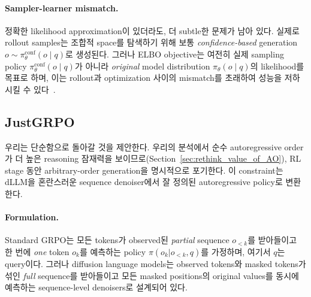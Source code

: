 \paragraph{Sampler-learner mismatch.}
정확한 likelihood approximation이 있더라도, 더 subtle한 문제가 남아 있다.
실제로 rollout samples는 조합적 space를 탐색하기 위해 보통 \emph{confidence-based} generation $o \sim \pi_{\theta}^{\text{conf}}(o \mid q)$로 생성된다.
그러나 ELBO objective는 여전히 실제 sampling policy $\pi_{\theta}^{\text{conf}}(o \mid q)$가 아니라 \emph{original} model distribution $\pi_\theta(o \mid q)$의 likelihood를 목표로 하며, 이는 rollout과 optimization 사이의 mismatch를 초래하여 성능을 저하시킬 수 있다~\cite{schulman2015trust}.


\subsection{JustGRPO}
\label{sec:justgrpo_detail}
우리는 단순함으로 돌아갈 것을 제안한다. 우리의 분석에서 순수 autoregressive order가 더 높은 reasoning 잠재력을 보이므로(Section~\ref{sec:rethink_value_of_AO}), RL stage 동안 arbitrary-order generation을 명시적으로 포기한다. 이 constraint는 dLLM을 혼란스러운 sequence denoiser에서 잘 정의된 autoregressive policy로 변환한다.

\paragraph{Formulation.}
Standard GRPO는 모든 tokens가 observed된 \emph{partial} sequence $o_{<k}$를 받아들이고 한 번에 \emph{one} token $o_k$를 예측하는 policy $\pi(o_k | o_{<k}, q)$를 가정하며, 여기서 $q$는 query이다.
그러나 diffusion language models는 observed tokens와 masked tokens가 섞인 \emph{full} sequence를 받아들이고 모든 masked positions의 original values를 동시에 예측하는 sequence-level denoisers로 설계되어 있다.

